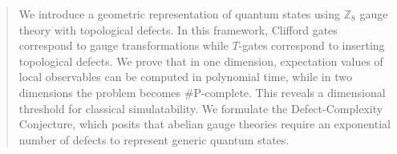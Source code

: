 \begin{abstract}
We introduce a geometric representation of quantum states using $\mathbb{Z}_8$ gauge theory with topological defects. In this framework, Clifford gates correspond to gauge transformations while $T$-gates correspond to inserting topological defects. We prove that in one dimension, expectation values of local observables can be computed in polynomial time, while in two dimensions the problem becomes \#P-complete. This reveals a dimensional threshold for classical simulatability. We formulate the Defect-Complexity Conjecture, which posits that abelian gauge theories require an exponential number of defects to represent generic quantum states.
\end{abstract}
